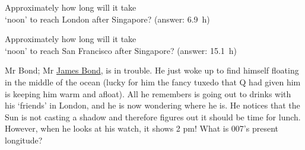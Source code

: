 \begin{enumerate}[\style (1)]\resume
	\begin{minipage}{0.475\linewidth}
		\item Approximately how long will it take\\ `noon' to reach London after Singapore?
		\abox{
			\scriptsize
			\[
			\begin{array}{R{0.55\linewidth}cl}
			Time taken by the Sun to `move' from one meridian to the next (i.e. to move by 1\degree) & = & 4~\text{min} \brk
			Number of meridians between Singapore \& London &= &103.9^{\circ}~\text{E}  - 0.3^{\circ}~\text{E} \\
			&=&103.6^{\circ}\\
			Time necessary for the Sun to move through $103.6^{\circ}$ & = & 4~\frac{\text{min} }{^{\circ}} \times 103.6^{\circ}\\
			&=&414.4~\text{min}\\
			&\approx&6.9~\text{h}
			\end{array}
			\]
		}
		\hfill\scriptsize(answer: 6.9~h)
	\end{minipage}
	\hspace{0.05\linewidth}
	\begin{minipage}{.475\linewidth}
		\item Approximately how long will it take\\ `noon' to reach San Francisco after Singapore?
		\abox{
			\scriptsize
			\[
			\begin{array}{R{0.55\linewidth}cl}
			Time taken by the Sun to `move' from one meridian to the next (i.e. to move by 1\degree) & = & 4~\text{min} \brk
			Number of meridians between Singapore \& San Francisco &= &103.9^{\circ}~\text{E}  + 122.4^{\circ}~\text{W} \\
			&=&226.3^{\circ}\\
			Time necessary for the Sun to move through $103.6^{\circ}$ & = & 4~\frac{\text{min} }{^{\circ}} \times 103.6^{\circ}\\
			&=&905.2~\text{min}\\
			&\approx&15.1~\text{h}
			\end{array}
			\]
		}
		\hfill\scriptsize(answer: 15.1~h)
	\end{minipage}

	\newpage

	\item Mr Bond; Mr \href{https://en.wikipedia.org/wiki/James_Bond}{James Bond}, is in trouble. He just woke up to find himself floating in the middle of the ocean (lucky for him the fancy tuxedo that Q had given him is keeping him warm and afloat). All he remembers is going out to drinks with his `friends' in London, and he is now wondering where he is. He notices that the Sun is not casting a shadow and therefore figures out it should be time for lunch. However, when he looks at his watch, it shows 2 pm! What is 007's present longitude?


\end{enumerate}
